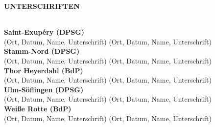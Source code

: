 \begin{Large}
    \textbf{UNTERSCHRIFTEN}
\end{Large}
\\

\textbf{Saint-Exupéry (DPSG)}
\\
(Ort, Datum, Name, Unterschrift) (Ort, Datum, Name, Unterschrift)
\\

\textbf{Stamm-Nord (DPSG)}
\\
(Ort, Datum, Name, Unterschrift) (Ort, Datum, Name, Unterschrift)
\\

\textbf{Thor Heyerdahl (BdP)}
\\
(Ort, Datum, Name, Unterschrift) (Ort, Datum, Name, Unterschrift)
\\

\textbf{Ulm-Söflingen (DPSG)}
\\
(Ort, Datum, Name, Unterschrift) (Ort, Datum, Name, Unterschrift)
\\

\textbf{Weiße Rotte (BdP)}
\\
(Ort, Datum, Name, Unterschrift) (Ort, Datum, Name, Unterschrift)
